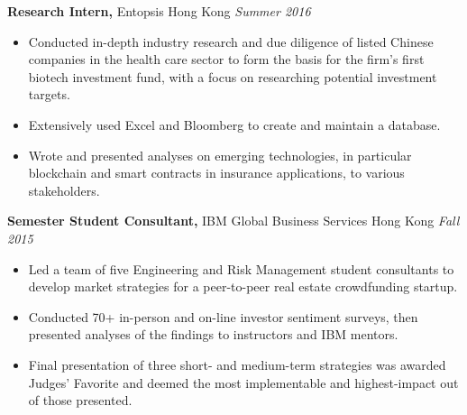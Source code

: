 \documentclass[resmargin]{res}
\begin{document}
\begin{resume}
 {\bf Research Intern,} Entopsis Hong Kong \hfill \textit{Summer 2016}
 \begin{itemize} \itemsep -2pt  %
 \item Conducted in-depth industry research and due diligence of listed Chinese companies in the health care sector to form the basis for the firm's first biotech investment fund, with a focus on researching potential investment targets.
 \item Extensively used Excel and Bloomberg to create and maintain a database.
 \item Wrote and presented analyses on emerging technologies, in particular blockchain and smart contracts in insurance applications, to various stakeholders.
 \end{itemize} %

%
{\bf Semester Student Consultant,} IBM Global Business Services Hong Kong \hfill \textit{Fall 2015}
\begin{itemize} \itemsep -2pt
\item Led a team of five Engineering and Risk Management student consultants to develop market strategies for a peer-to-peer real estate crowdfunding startup.
\item Conducted 70+ in-person and on-line investor sentiment surveys, then presented analyses of the findings to instructors and IBM mentors.
\item Final presentation of three short- and medium-term strategies was awarded Judges' Favorite and deemed the most implementable and highest-impact out of those presented.
\end{itemize} %


\end{resume}
\end{document}
